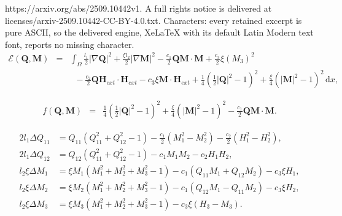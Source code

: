 \documentclass[10pt,a4paper]{amsart}
\def \Mvec{\mathbf{M}}
\def\Hvec{\mathbf{H}}
\def\Qvec{\mathbf{Q}}
\def\d{\mathrm{d}}
\begin{document}
https://arxiv.org/abs/2509.10442v1. A full rights notice is delivered at licenses/arxiv-2509.10442-CC-BY-4.0.txt. Characters: every retained excerpt is pure ASCII, so the delivered engine, XeLaTeX with its default Latin Modern text font, reports no missing character.
\begin{eqnarray}\label{en:2}
\mathcal{E}\left(\Qvec, \Mvec\right)&=&\int_{\Omega}\frac{l_1}{2}|\nabla \Qvec|^2 + \frac{\xi l_2}{2}|\nabla \Mvec|^2 - \frac{c_1}{2}\Qvec\Mvec\cdot\Mvec 
+ \frac{c_3}{2}\xi\left(M_3\right)^2
\nonumber\\
&& \;\;- \frac{c_2}{2}\Qvec\Hvec_{ext}\cdot\Hvec_{ext} 
- c_3\xi\Mvec\cdot\Hvec_{ext} + \frac{1}{4}\left(\frac{1}{2}|\Qvec|^2 - 1\right)^2 + \frac{\xi}{4}\left(|\Mvec|^2 - 1\right)^2 \,\d x,
\end{eqnarray}

\begin{eqnarray} \label{def-f}
f\left(\Qvec, \Mvec\right)&=&  \frac{1}{4}\left(\frac{1}{2}|\Qvec|^2 - 1\right)^2 + \frac{\xi}{4}\left(|\Mvec|^2 - 1\right)^2 -  \frac{c_1}{2}\Qvec\Mvec\cdot\Mvec.
\end{eqnarray}

\begin{align}
\label{EL:1}
2l_1\Delta Q_{11} &=  Q_{11}\left(Q_{11}^2 + Q_{12}^2 -1\right) - \frac{c_1}{2}\left(M_1^2 - M_2^2\right) - \frac{c_2}{2}\left(H_1^2 - H_2^2\right),\\
\label{EL:2}
2l_1\Delta Q_{12} &=  Q_{12}\left(Q_{11}^2 + Q_{12}^2 - 1\right) - c_1M_1M_2 - c_2H_1H_2,\\
\label{EL:3}
l_2\xi\Delta M_1 &= \xi M_1\left(M_1^2 + M_2^2 + M_3^2 - 1\right) - c_1\left(Q_{11}M_1 + Q_{12}M_2\right) - c_3\xi H_1,\\
\label{EL:4}
l_2\xi\Delta M_2 &= \xi M_2\left(M_1^2 + M_2^2 + M_3^2 - 1\right) - c_1\left(Q_{12}M_1 - Q_{11}M_2\right) - c_3\xi H_2,\\
\label{EL:5}
l_2\xi\Delta M_3 &= \xi M_3\left(M_1^2 + M_2^2 + M_3^2 - 1\right) - c_3\xi \left(H_3-M_3\right).
\end{align}
\end{document}
